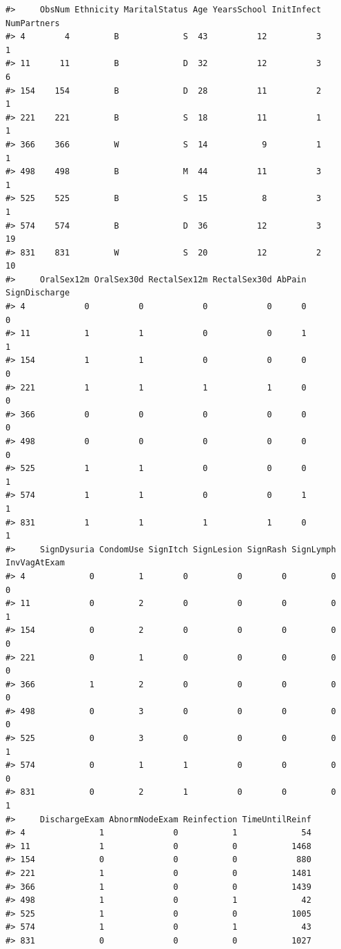 \documentclass[
]{article}
\begin{document}
\begin{verbatim}
#>     ObsNum Ethnicity MaritalStatus Age YearsSchool InitInfect NumPartners
#> 4        4         B             S  43          12          3           1
#> 11      11         B             D  32          12          3           6
#> 154    154         B             D  28          11          2           1
#> 221    221         B             S  18          11          1           1
#> 366    366         W             S  14           9          1           1
#> 498    498         B             M  44          11          3           1
#> 525    525         B             S  15           8          3           1
#> 574    574         B             D  36          12          3          19
#> 831    831         W             S  20          12          2          10
#>     OralSex12m OralSex30d RectalSex12m RectalSex30d AbPain SignDischarge
#> 4            0          0            0            0      0             0
#> 11           1          1            0            0      1             1
#> 154          1          1            0            0      0             0
#> 221          1          1            1            1      0             0
#> 366          0          0            0            0      0             0
#> 498          0          0            0            0      0             0
#> 525          1          1            0            0      0             1
#> 574          1          1            0            0      1             1
#> 831          1          1            1            1      0             1
#>     SignDysuria CondomUse SignItch SignLesion SignRash SignLymph InvVagAtExam
#> 4             0         1        0          0        0         0            0
#> 11            0         2        0          0        0         0            1
#> 154           0         2        0          0        0         0            0
#> 221           0         1        0          0        0         0            0
#> 366           1         2        0          0        0         0            0
#> 498           0         3        0          0        0         0            0
#> 525           0         3        0          0        0         0            1
#> 574           0         1        1          0        0         0            0
#> 831           0         2        1          0        0         0            1
#>     DischargeExam AbnormNodeExam Reinfection TimeUntilReinf
#> 4               1              0           1             54
#> 11              1              0           0           1468
#> 154             0              0           0            880
#> 221             1              0           0           1481
#> 366             1              0           0           1439
#> 498             1              0           1             42
#> 525             1              0           0           1005
#> 574             1              0           1             43
#> 831             0              0           0           1027
\end{verbatim}
\end{document}

